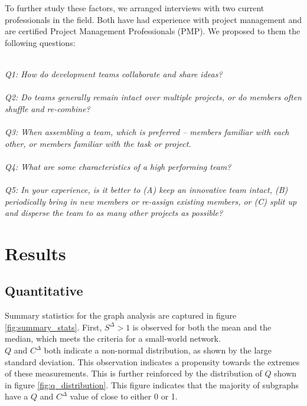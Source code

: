 \documentclass{proc}
\begin{document}
To further study these factors, we arranged interviews with two current professionals in the field. Both have had experience with project management and are certified Project Management Professionals (PMP)\textregistered. We proposed to them the following questions:

\noindent\\\textit{Q1: How do development teams collaborate and share ideas?}\\
\noindent\\\textit{Q2: Do teams generally remain intact over multiple projects, or do members often shuffle and re-combine?}\\
\noindent\\\textit{Q3: When assembling a team, which is preferred -- members familiar with each other, or members familiar with the task or project.}\\
\noindent\\\textit{Q4: What are some characteristics of a high performing team?}\\
\noindent\\\textit{Q5: In your experience, is it better to (A) keep an innovative team intact, (B) periodically bring in new members or re-assign existing members, or (C) split up and disperse the team to as many other projects as possible?}\\
 

\section{Results}

\subsection{Quantitative}



Summary statistics for the graph analysis are captured in figure \ref{fig:summary_stats}. First, $S^\Delta > 1$ is observed for both the mean and the median, which meets the criteria for a small-world network\cite{humphries2008network}.\\

$Q$ and $C^\Delta$ both indicate a non-normal distribution, as shown by the large standard deviation. This observation indicates a propensity towards the extremes of these measurements. This is further reinforced by the distribution of $Q$ shown in figure \ref{fig:q_distribution}. This figure indicates that the majority of subgraphs have a $Q$ and $C^\Delta$ value of close to either 0 or 1.\\
\end{document}
